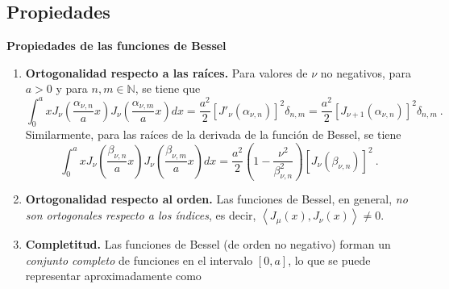 \subsection{Propiedades}
\begin{propiedad}
    \textbf{Propiedades de las funciones de Bessel}

    \begin{enumerate}
        \item \textbf{Ortogonalidad respecto a las raíces.} Para valores de $\nu$ no negativos, para $a > 0$ y para $n, m \in \mathbb{N}$, se tiene que
        \begin{equation}
            \int_0^a x J_{\nu} \left( \frac{\alpha_{\nu, n}}{a} x \right) J_\nu\left( \frac{\alpha_{\nu, m}}{a} x \right) dx = \frac{a^2}{2} [J'_\nu(\alpha_{\nu, n})]^2 \delta_{n, m} = \frac{a^2}{2} [J_{\nu+1}(\alpha_{\nu, n})]^2 \delta_{n, m} \ .
        \end{equation}
        Similarmente, para las raíces de la derivada de la función de Bessel, se tiene
        \begin{equation}
            \int_0^a x J_\nu\left(\frac{\beta_{\nu, n}}{a}x \right) J_\nu\left(\frac{\beta_{\nu, m}}{a}x \right) dx = \frac{a^2}{2} \left( 1 - \frac{\nu^2}{\beta^2_{\nu, n}} \right) \left[ J_\nu(\beta_{\nu, n}) \right]^2 \ .
        \end{equation}
        \item \textbf{Ortogonalidad respecto al orden.} Las funciones de Bessel, en general, \emph{no son ortogonales respecto a los índices}, es decir, $\left\langle J_\mu(x), J_\nu(x) \right\rangle \neq 0$.
        \item \textbf{Completitud.} Las funciones de Bessel (de orden no negativo) forman un \emph{conjunto completo} de funciones en el intervalo $[0,a]$, lo que se puede representar aproximadamente como \cite{Reimberg2015}

\end{enumerate}
\end{propiedad}
